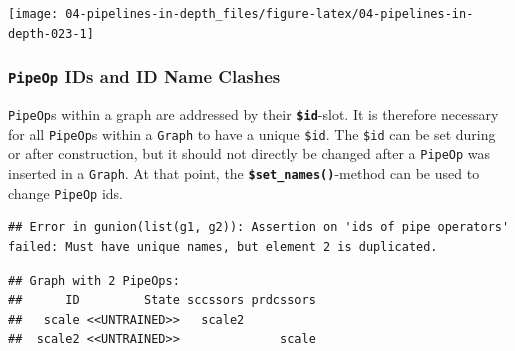 \documentclass[]{scrbook}
\newenvironment{Shaded}{\begin{snugshade}}{\end{snugshade}}
\newcommand{\KeywordTok}[1]{\textcolor[rgb]{0.13,0.29,0.53}{\textbf{#1}}}
\newcommand{\NormalTok}[1]{#1}
\newcommand{\OperatorTok}[1]{\textcolor[rgb]{0.81,0.36,0.00}{\textbf{#1}}}
\newcommand{\StringTok}[1]{\textcolor[rgb]{0.31,0.60,0.02}{#1}}
\renewenvironment{Shaded} {\begin{snugshade}\small} {\end{snugshade}}
\begin{document}
\begin{center}\texttt{[image: 04-pipelines-in-depth\_files/figure-latex/04-pipelines-in-depth-023-1]} \end{center}

\hypertarget{pipeop-ids-and-id-name-clashes}{%
\subsubsection{\texorpdfstring{\texttt{PipeOp} IDs and ID Name Clashes}{PipeOp IDs and ID Name Clashes}}\label{pipeop-ids-and-id-name-clashes}}

\texttt{PipeOp}s within a graph are addressed by their \textbf{\texttt{\$id}}-slot.
It is therefore necessary for all \texttt{PipeOp}s within a \texttt{Graph} to have a unique \texttt{\$id}.
The \texttt{\$id} can be set during or after construction, but it should not directly be changed after a \texttt{PipeOp} was inserted in a \texttt{Graph}.
At that point, the \textbf{\texttt{\$set\_names()}}-method can be used to change \texttt{PipeOp} ids.

\begin{Shaded}
\end{Shaded}

\begin{verbatim}
## Error in gunion(list(g1, g2)): Assertion on 'ids of pipe operators' failed: Must have unique names, but element 2 is duplicated.
\end{verbatim}

\begin{Shaded}
\end{Shaded}

\begin{verbatim}
## Graph with 2 PipeOps:
##      ID         State sccssors prdcssors
##   scale <<UNTRAINED>>   scale2          
##  scale2 <<UNTRAINED>>              scale
\end{verbatim}
\end{document}
